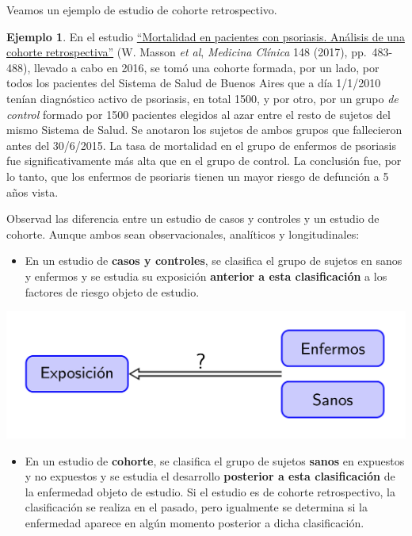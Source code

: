\documentclass[
]{book}
\providecommand{\tightlist}{%
  \setlength{\itemsep}{0pt}\setlength{\parskip}{0pt}}
\theoremstyle{definition}
\theoremstyle{definition}
\newtheorem{example}{Ejemplo}[chapter]
\theoremstyle{definition}
\theoremstyle{definition}
\theoremstyle{remark}
\begin{document}
Veamos un ejemplo de estudio de cohorte retrospectivo.

\begin{example}
\protect\hypertarget{exm:psoriasis}{}\label{exm:psoriasis}En el estudio \href{https://www.sciencedirect.com/science/article/pii/S0025775316306832}{``Mortalidad en pacientes con psoriasis. Análisis de una cohorte retrospectiva''} (W. Masson \emph{et al}, \emph{Medicina Clínica} 148 (2017), pp.~483-488), llevado a cabo en 2016, se tomó una cohorte formada, por un lado, por todos los pacientes del Sistema de Salud de Buenos Aires que a día 1/1/2010 tenían diagnóstico activo de psoriasis, en total 1500, y por otro, por un grupo \emph{de control} formado por 1500 pacientes elegidos al azar entre el resto de sujetos del mismo Sistema de Salud. Se anotaron los sujetos de ambos grupos que fallecieron antes del 30/6/2015. La tasa de mortalidad en el grupo de enfermos de psoriasis fue significativamente más alta que en el grupo de control. La conclusión fue, por lo tanto, que los enfermos de psoriaris tienen un mayor riesgo de defunción a 5 años vista.
\end{example}

Observad las diferencia entre un estudio de casos y controles y un estudio de cohorte. Aunque ambos sean observacionales, analíticos y longitudinales:

\begin{itemize}
\tightlist
\item
  En un estudio de \textbf{casos y controles}, se clasifica el grupo de sujetos en sanos y enfermos y se estudia su exposición \textbf{anterior a esta clasificación} a los factores de riesgo objeto de estudio.
\end{itemize}

\begin{center}\includegraphics[width=0.8\linewidth]{INREMDN_files/figure-html/CyC} \end{center}

\begin{itemize}
\tightlist
\item
  En un estudio de \textbf{cohorte}, se clasifica el grupo de sujetos \textbf{sanos} en expuestos y no expuestos y se estudia el desarrollo \textbf{posterior a esta clasificación} de la enfermedad objeto de estudio. Si el estudio es de cohorte retrospectivo, la clasificación se realiza en el pasado, pero igualmente se determina si la enfermedad aparece en algún momento posterior a dicha clasificación.
\end{itemize}
\end{document}
